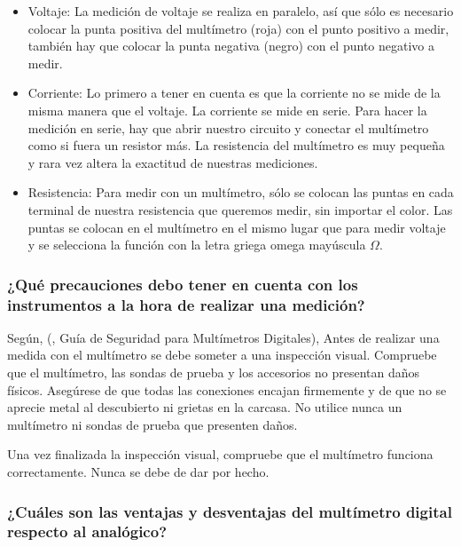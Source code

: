 \documentclass[letterpaper, 12pt]{report}
\begin{document}
\begin{itemize}
	\item Voltaje: La medición de voltaje se realiza en paralelo, así que
	      sólo es necesario colocar la punta positiva del multímetro (roja) con
	      el punto positivo a medir, también hay que colocar la punta negativa
	      (negro) con el punto negativo a medir.~\cite{AcMaxMexico}

	\item Corriente: Lo primero a tener en cuenta es que la corriente no se
	      mide de la misma manera que el voltaje. La corriente se mide en serie.
	      Para hacer la medición en serie, hay que abrir nuestro circuito y
	      conectar el multímetro como si fuera un resistor más. La resistencia
	      del multímetro es muy pequeña y rara vez altera la exactitud de
	      nuestras mediciones.~\cite{AcMaxMexico}

	\item Resistencia: Para medir con un multímetro, sólo se colocan las puntas
	      en cada terminal de nuestra resistencia que queremos medir, sin importar
	      el color. Las puntas se colocan en el multímetro en el mismo lugar que
	      para medir voltaje y se selecciona la función con la letra griega omega
	      mayúscula $\Omega$.~\cite{AcMaxMexico}
\end{itemize}

\subsubsection{¿Qué precauciones debo tener en cuenta con los instrumentos a
	la hora de realizar una medición?}

Según, (\cite{flukeCorporation}, Guía de Seguridad para Multímetros Digitales),
Antes de realizar una medida con el multímetro se debe someter a una inspección
visual. Compruebe que el multímetro, las sondas de prueba y los accesorios no
presentan daños físicos. Asegúrese de que todas las conexiones encajan
firmemente y de que no se aprecie metal al descubierto ni grietas en la carcasa.
No utilice nunca un multímetro ni sondas de prueba que presenten daños.

\vspace{.5cm}

Una vez finalizada la inspección visual, compruebe que el multímetro
funciona correctamente. Nunca se debe de dar por hecho.

\subsubsection{¿Cuáles son las ventajas y desventajas del multímetro digital
	respecto al analógico?}
\end{document}
